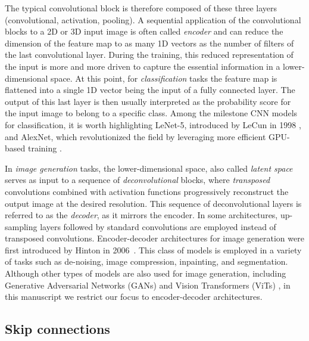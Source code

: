 The typical convolutional block is therefore composed of these three layers (convolutional, activation, pooling). 
A sequential application of the convolutional blocks to a 2D or 3D input image is often called \textit{encoder} and 
can reduce the dimension of the 
feature map to as many 1D vectors as the number of filters of the last convolutional layer. During the training, this 
reduced representation of the input is more and more driven to capture the essential information in a lower-dimensional 
space. At this point, for \textit{classification} tasks the feature map is flattened into a single 1D vector 
being the input of a fully connected layer. The output of this last layer is then usually interpreted as the probability 
score for the input image to belong to a specific class. Among the milestone CNN models for classification, it is worth 
highlighting LeNet-5, introduced by LeCun in 1998 \cite{lecun1998gradient}, and AlexNet, which revolutionized the 
field by leveraging more efficient GPU-based training \cite{krizhevsky2012imagenet}.

In \textit{image generation} tasks, the lower-dimensional space, also called \textit{latent space} serves as input 
to a sequence of 
\textit{deconvolutional} blocks, where \textit{transposed} convolutions combined with activation functions 
progressively reconstruct the output image at the desired resolution. This sequence of deconvolutional layers 
is referred to as the \textit{decoder}, as it mirrors the encoder. In some architectures, up-sampling layers 
followed by standard convolutions are employed instead of transposed convolutions. Encoder-decoder architectures 
for image generation were first introduced by Hinton in 2006~\cite{hinton2006reducing}. This class of models is employed 
in a variety of tasks such as de-noising, image compression, inpainting, 
and segmentation. Although other types of models are also used for image generation, including Generative 
Adversarial Networks (GANs) \cite{goodfellow2014generativeadversarialnetworks} and Vision Transformers 
(ViTs) \cite{dosovitskiy2021imageworth16x16words}, in this manuscript we restrict our focus to 
encoder-decoder architectures.


\subsection{Skip connections}

